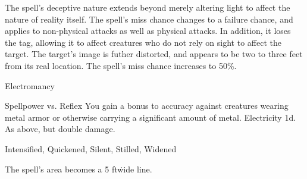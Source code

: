 The spell's deceptive nature extends beyond merely altering light to affect the nature of reality itself.
The spell's miss chance changes to a failure chance, and applies to non-physical attacks as well as physical attacks.
In addition, it loses the  tag, allowing it to affect creatures who do not rely on sight to affect the target.
The target's image is futher distorted, and appears to be two to three feet from its real location.
The spell's miss chance increases to 50\%.
\begin{spellsection}{Electromancy}
\begin{spellheader}
\end{spellheader}
\begin{spellcontent}
\begin{spelltargetinginfo}
\end{spelltargetinginfo}
\begin{spelleffects}
\begin{spellattack}{Spellpower vs. Reflex}
\spellspecial You gain a  bonus to accuracy against creatures wearing metal armor or otherwise carrying a significant amount of metal.
\spellsuccess
Electricity  \minus1d.
\spellcritical As above, but double damage.
\end{spellattack}
\end{spelleffects}
\end{spellcontent}
\begin{spellfooter}
 Intensified, Quickened, Silent, Stilled, Widened
\end{spellfooter}
\begin{spellsubcontent}
\begin{spellcantrip}
The spell's area becomes a 5 ft\. wide \areamed line.
\end{spellcantrip}
\end{spellsubcontent}
\end{spellsection}
